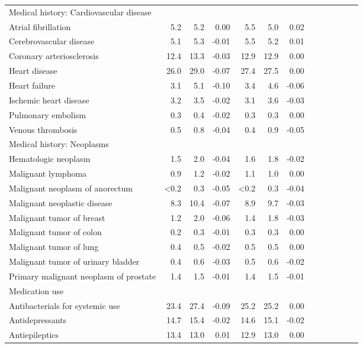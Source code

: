 \documentclass[11pt,]{article}
\begin{document}
\begin{longtable}{lrrrrrrrrrrrr}
  Medical history: Cardiovascular disease &    &    &     &    &    &     \\ 
      Atrial fibrillation &  5.2 &  5.2 &  0.00 &  5.5 &  5.0 &  0.02 \\ 
      Cerebrovascular disease &  5.1 &  5.3 & -0.01 &  5.5 &  5.2 &  0.01 \\ 
      Coronary arteriosclerosis & 12.4 & 13.3 & -0.03 & 12.9 & 12.9 &  0.00 \\ 
      Heart disease & 26.0 & 29.0 & -0.07 & 27.4 & 27.5 &  0.00 \\ 
      Heart failure &  3.1 &  5.1 & -0.10 &  3.4 &  4.6 & -0.06 \\ 
      Ischemic heart disease &  3.2 &  3.5 & -0.02 &  3.1 &  3.6 & -0.03 \\ 
      Pulmonary embolism &  0.3 &  0.4 & -0.02 &  0.3 &  0.3 &  0.00 \\ 
      Venous thrombosis &  0.5 &  0.8 & -0.04 &  0.4 &  0.9 & -0.05 \\ 
  Medical history: Neoplasms &    &    &     &    &    &     \\ 
      Hematologic neoplasm &  1.5 &  2.0 & -0.04 &  1.6 &  1.8 & -0.02 \\ 
      Malignant lymphoma &  0.9 &  1.2 & -0.02 &  1.1 &  1.0 &  0.00 \\ 
      Malignant neoplasm of anorectum & <0.2 &  0.3 & -0.05 & <0.2 &  0.3 & -0.04 \\ 
      Malignant neoplastic disease &  8.3 & 10.4 & -0.07 &  8.9 &  9.7 & -0.03 \\ 
      Malignant tumor of breast &  1.2 &  2.0 & -0.06 &  1.4 &  1.8 & -0.03 \\ 
      Malignant tumor of colon &  0.2 &  0.3 & -0.01 &  0.3 &  0.3 &  0.00 \\ 
      Malignant tumor of lung &  0.4 &  0.5 & -0.02 &  0.5 &  0.5 &  0.00 \\ 
      Malignant tumor of urinary bladder &  0.4 &  0.6 & -0.03 &  0.5 &  0.6 & -0.02 \\ 
      Primary malignant neoplasm of prostate &  1.4 &  1.5 & -0.01 &  1.4 &  1.5 & -0.01 \\ 
  Medication use &    &    &     &    &    &     \\ 
      Antibacterials for systemic use & 23.4 & 27.4 & -0.09 & 25.2 & 25.2 &  0.00 \\ 
      Antidepressants & 14.7 & 15.4 & -0.02 & 14.6 & 15.1 & -0.02 \\ 
      Antiepileptics & 13.4 & 13.0 &  0.01 & 12.9 & 13.0 &  0.00 \\ 

\end{longtable}
\end{document}
